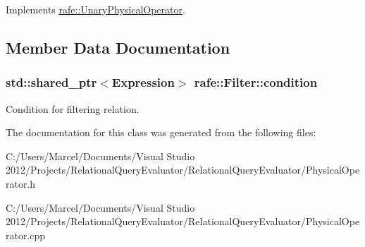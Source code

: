 Implements \hyperlink{classrafe_1_1_unary_physical_operator_a56a160698a78f8a0aa44e47e0804f45e}{rafe\+::\+Unary\+Physical\+Operator}.



\subsection{Member Data Documentation}
\hypertarget{classrafe_1_1_filter_ac57844e611bd2d1951d1d4089135ddb9}{
\subsubsection[{condition}]{\setlength{\rightskip}{0pt plus 5cm}std\+::shared\+\_\+ptr$<${\bf Expression}$>$ rafe\+::\+Filter\+::condition}}\label{classrafe_1_1_filter_ac57844e611bd2d1951d1d4089135ddb9}
Condition for filtering relation. 

The documentation for this class was generated from the following files\+:\begin{DoxyCompactItemize}
\item 
C\+:/\+Users/\+Marcel/\+Documents/\+Visual Studio 2012/\+Projects/\+Relational\+Query\+Evaluator/\+Relational\+Query\+Evaluator/Physical\+Operator.\+h\item 
C\+:/\+Users/\+Marcel/\+Documents/\+Visual Studio 2012/\+Projects/\+Relational\+Query\+Evaluator/\+Relational\+Query\+Evaluator/Physical\+Operator.\+cpp\end{DoxyCompactItemize}
